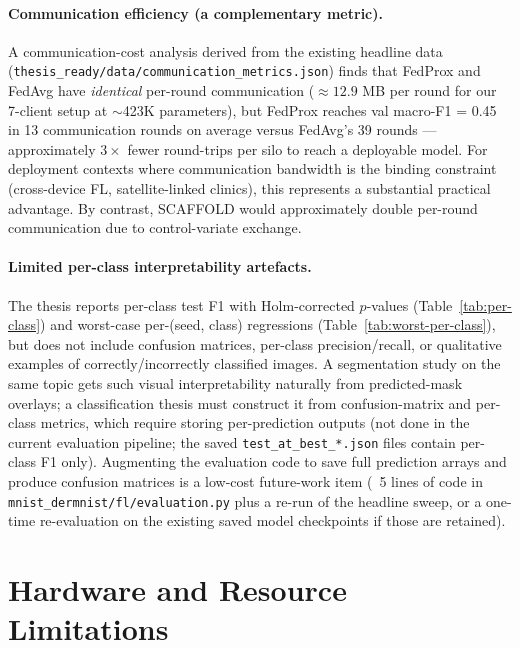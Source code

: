 \documentclass[11pt,a4paper]{article}
\begin{document}
\paragraph{Communication efficiency (a complementary metric).}
A communication-cost analysis derived from the existing headline data
(\texttt{thesis\_ready/data/communication\_metrics.json}) finds that
FedProx and FedAvg have \emph{identical} per-round communication
($\approx 12.9$ MB per round for our 7-client setup at $\sim$423K
parameters), but FedProx reaches val macro-F1 = 0.45 in 13 communication
rounds on average versus FedAvg's 39 rounds --- approximately $3\times$
fewer round-trips per silo to reach a deployable model. For deployment
contexts where communication bandwidth is the binding constraint
(cross-device FL, satellite-linked clinics), this represents a
substantial practical advantage. By contrast, SCAFFOLD would
approximately double per-round communication due to control-variate
exchange.

\paragraph{Limited per-class interpretability artefacts.} The thesis
reports per-class test F1 with Holm-corrected $p$-values
(Table~\ref{tab:per-class}) and worst-case per-(seed, class) regressions
(Table~\ref{tab:worst-per-class}), but does not include confusion
matrices, per-class precision/recall, or qualitative examples of
correctly/incorrectly classified images. A segmentation study on the
same topic gets such visual interpretability naturally from
predicted-mask overlays; a classification thesis must
construct it from confusion-matrix and per-class metrics, which require
storing per-prediction outputs (not done in the current evaluation
pipeline; the saved \texttt{test\_at\_best\_*.json} files contain
per-class F1 only). Augmenting the evaluation code to save full
prediction arrays and produce confusion matrices is a low-cost
future-work item (~5 lines of code in
\texttt{mnist\_dermnist/fl/evaluation.py} plus a re-run of the headline
sweep, or a one-time re-evaluation on the existing saved model
checkpoints if those are retained).

\section{Hardware and Resource Limitations}\label{sec:hardware}
\end{document}
